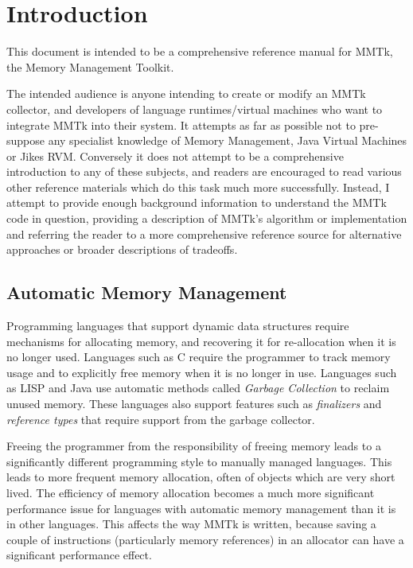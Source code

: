 \chapter{Introduction}

This document is intended to be a comprehensive reference manual for MMTk, the Memory Management Toolkit.

The intended audience is anyone intending to create or modify an MMTk collector, and developers of
language runtimes/virtual machines who want to integrate MMTk into their system.
It attempts as far as possible not to pre-suppose any specialist knowledge of Memory Management, Java
Virtual Machines or Jikes RVM.
Conversely it does not attempt to be a comprehensive introduction to any of these subjects, and
readers are encouraged to read various other reference materials which do this task much more successfully.
Instead, I attempt to provide enough background information to understand the MMTk code in question,
providing a description of MMTk's algorithm or implementation and referring the reader to a more
comprehensive reference source for alternative approaches or broader descriptions of tradeoffs.

%
\section{Automatic Memory Management}

Programming languages that support dynamic data structures require mechanisms for allocating memory,
and recovering it for re-allocation when it is no longer used.  Languages such as C require the programmer
to track memory usage and to explicitly free memory when it is no longer in use.  Languages such as LISP
and Java use automatic methods called \emph{Garbage Collection} to reclaim unused memory.  These languages
also support features such as \emph{finalizers} and \emph{reference types} that require support from the
garbage collector.

Freeing the programmer from the responsibility of freeing memory leads to a significantly different programming
style to manually managed languages. This leads to more frequent memory allocation, often of objects which
are very short lived.  The efficiency of memory allocation becomes a much more significant performance 
issue for languages with automatic memory management than it is in other languages.  This affects the way
MMTk is written, because saving a couple of instructions (particularly memory references) in an allocator
can have a significant performance effect.


